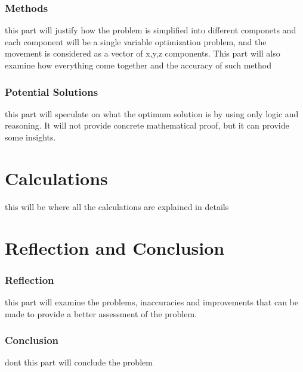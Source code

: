 \documentclass[a4paper, 12pt]{article}
\begin{document}
		\section{Methods}
		this part will justify how the problem is simplified into different componets and each component will be a single variable optimization problem, and the movement is considered as a vector of x,y,z components. This part will also examine how everything come together and the accuracy of such method
		\section{Potential Solutions}
		this part will speculate on what the optimum solution is by using only logic and reasoning. It will not provide concrete mathematical proof, but it can provide some insights.

	\part{Calculations}
	this will be where all the calculations are explained in details

	\part{Reflection and Conclusion}
		\section{Reflection}
		this part will examine the problems, inaccuracies and improvements that can be made to provide a better assessment of the problem.
		\section{Conclusion}dont 
		this part will conclude the problem
\end{document}
